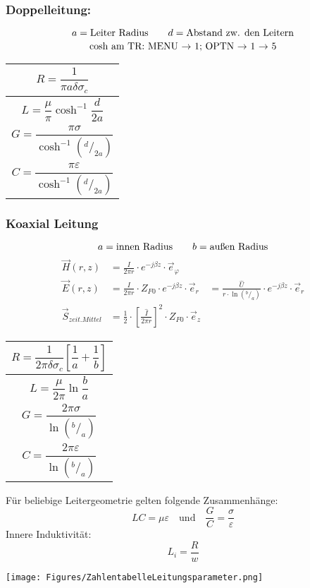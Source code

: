 \subsubsection{Doppelleitung:}
{\small\[
        a = \text{Leiter Radius} \qquad d = \text{Abstand zw. den Leitern}\\
    \]}
{\small\[
        \text{cosh am TR: MENU $\rightarrow$ 1; OPTN $\rightarrow$ 1 $\rightarrow$ 5}\\
    \]}

{\renewcommand*{\arraystretch}{0.2}
    \begin{tabularx}{0.5\columnwidth}{|X|}
        \hline
        \[R  = \frac{1}{\pi a\delta\sigma_c}\]              \\
        \hline
        \[L = \frac{\mu}{\pi} \cosh^{-1}\frac{d}{2a}\]      \\
        \hline
        \[G = \frac{\pi\sigma}{\cosh^{-1}(^d/_{2a})}\]      \\
        \hline
        \[C = \frac{\pi\varepsilon}{\cosh^{-1}(^d/_{2a})}\] \\
        \hline
    \end{tabularx}}

\subsubsection{Koaxial Leitung}
{\small\[
        a = \text{innen Radius} \qquad b = \text{außen Radius} \\
    \]}
\begin{align*}
    \vec{H}(r, z)         & = \frac{\hat{I}}{2\pi r}\cdot e^{-j\beta z}\cdot\vec{e}_\varphi                   \\
    \vec{E}(r, z)         & = \frac{\hat{I}}{2\pi r}\cdot Z_{F0}\cdot e^{-j\beta z} \cdot\vec{e}_r
                          & = \frac{\hat{U}}{r \cdot\ln{(^{b}/_{a})}}\cdot e^{-j\beta z}\cdot\vec{e}_r        \\
    \vec{S}_{zeit.Mittel} & = \frac{1}{2}\cdot\left[\frac{\hat{I}}{2\pi r}\right]^2\cdot Z_{F0}\cdot\vec{e}_z
\end{align*}

{\renewcommand*{\arraystretch}{0.2}
    \begin{tabularx}{0.5\columnwidth}{|X|}
        \hline
        \[R=\frac{1}{2\pi\delta\sigma_c}\left[\frac{1}{a}+\frac{1}{b}\right]\] \\
        \hline
        \[L=\frac{\mu}{2\pi}\ln\frac{b}{a}\]                                   \\
        \hline
        \[G=\frac{2\pi\sigma}{\ln(^b/_a)}\]                                    \\
        \hline
        \[C=\frac{2\pi\varepsilon}{\ln(^b/_a)}\]                               \\
        \hline
    \end{tabularx}}



\vspace{1ex}
Für beliebige Leitergeometrie gelten folgende Zusammenhänge:
\[
    LC = \mu\varepsilon \quad \text{und} \quad \frac{G}{C} = \frac{\sigma}{\varepsilon}
\]
Innere Induktivität:
\[
    L_i = \frac{R}{w}
\]

\texttt{[image: Figures/ZahlentabelleLeitungsparameter.png]}